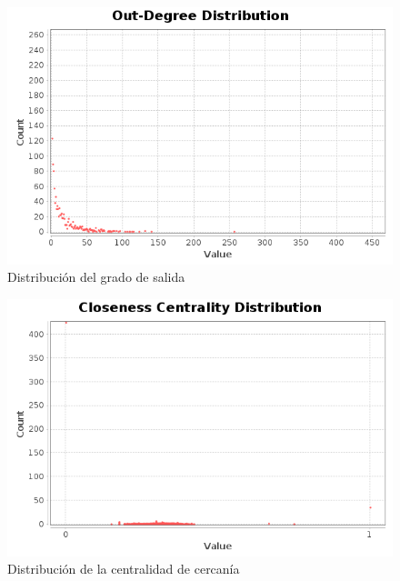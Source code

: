 \begin{figure}
    \includegraphics[width=\textwidth]{images/visualization/plots/outdegree-distribution.png}
    \caption{Distribución del grado de salida}
    \label{fig:plot-outdegree-distribution}
\end{figure}

\begin{figure}
    \includegraphics[width=\textwidth]{images/visualization/plots/closeness-centrality-distribution.png}
    \caption{Distribución de la centralidad de cercanía}
    \label{fig:plot-closeness-centrality-distribution}
\end{figure}

